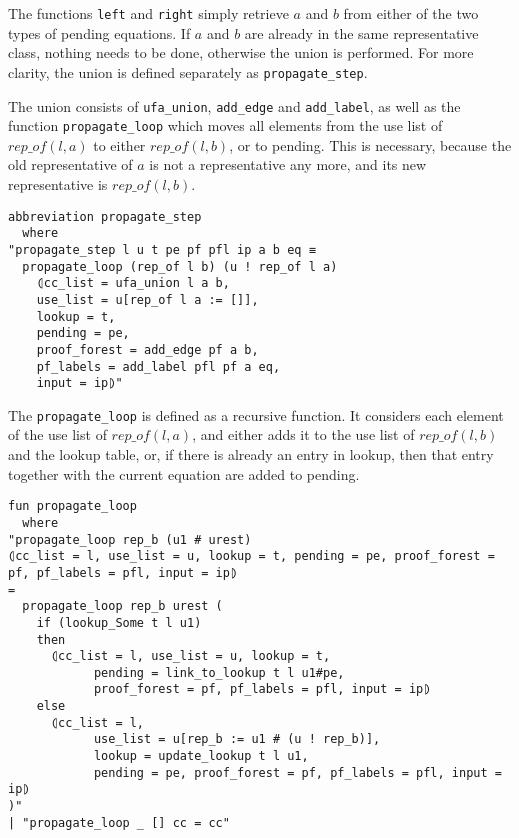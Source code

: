 The functions \lstinline{left} and \lstinline{right} simply retrieve $a$ and $b$ from either of the two types of pending equations. If $a$ and $b$ are already in the same representative class, nothing needs to be done, otherwise the union is performed. For more clarity, the union is defined separately as \lstinline{propagate_step}.


The union consists of \lstinline{ufa_union}, \lstinline{add_edge} and \lstinline{add_label}, as well as the function \lstinline|propagate_loop| which moves all elements from the use list of $rep\_of(l,a)$ to either $rep\_of(l, b)$, or to pending. This is necessary, because the old representative of $a$ is not a representative any more, and its new representative is  $rep\_of(l, b)$.

\begin{lstlisting}
abbreviation propagate_step
  where
"propagate_step l u t pe pf pfl ip a b eq ≡
  propagate_loop (rep_of l b) (u ! rep_of l a)
    ⦇cc_list = ufa_union l a b,
    use_list = u[rep_of l a := []],
    lookup = t,
    pending = pe,
    proof_forest = add_edge pf a b,
    pf_labels = add_label pfl pf a eq,
    input = ip⦈"
\end{lstlisting}

The \lstinline|propagate_loop| is defined as a recursive function. It considers each element of the use list of $rep\_of(l, a)$, and either adds it to the use list of $rep\_of(l, b)$ and the lookup table, or, if there is already an entry in lookup, then that entry together with the current equation are added to pending.

\begin{lstlisting}
fun propagate_loop
  where
"propagate_loop rep_b (u1 # urest)
⦇cc_list = l, use_list = u, lookup = t, pending = pe, proof_forest = pf, pf_labels = pfl, input = ip⦈
=
  propagate_loop rep_b urest (
    if (lookup_Some t l u1)
    then
      ⦇cc_list = l, use_list = u, lookup = t,
            pending = link_to_lookup t l u1#pe,
            proof_forest = pf, pf_labels = pfl, input = ip⦈
    else
      ⦇cc_list = l,
            use_list = u[rep_b := u1 # (u ! rep_b)],
            lookup = update_lookup t l u1,
            pending = pe, proof_forest = pf, pf_labels = pfl, input = ip⦈
)"
| "propagate_loop _ [] cc = cc"
\end{lstlisting}

